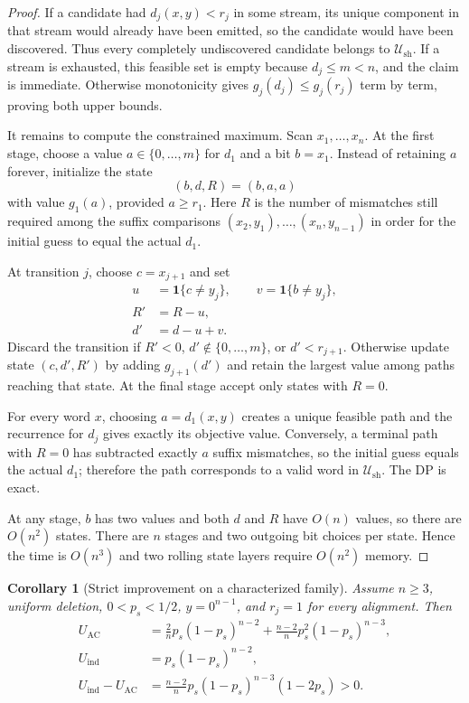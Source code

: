 \documentclass[11pt]{article}
\newtheorem{corollary}[theorem]{Corollary}
\theoremstyle{remark}
\newcommand{\ind}{\mathbf 1}
\begin{document}
\begin{proof}
If a candidate had $d_j(x,y)<r_j$ in some stream, its unique component in that stream
would already have been emitted, so the candidate would have been discovered. Thus every
completely undiscovered candidate belongs to $\mathcal U_{\mathrm{sh}}$. If a stream is
exhausted, this feasible set is empty because $d_j\le m<n$, and the claim is immediate.
Otherwise monotonicity gives $g_j(d_j)\le g_j(r_j)$ term by term, proving both upper bounds.

It remains to compute the constrained maximum. Scan $x_1,\ldots,x_n$. At the first stage,
choose a value $a\in\{0,\ldots,m\}$ for $d_1$ and a bit $b=x_1$. Instead of retaining
$a$ forever, initialize the state
\[
 (b,d,R)=(b,a,a)
\]
with value $g_1(a)$, provided $a\ge r_1$. Here $R$ is the number of mismatches still
required among the suffix comparisons $(x_2,y_1),\ldots,(x_n,y_{n-1})$ in order for the
initial guess to equal the actual $d_1$.

At transition $j$, choose $c=x_{j+1}$ and set
\begin{align*}
 u&=\ind\{c\ne y_j\},\qquad v=\ind\{b\ne y_j\},\\
 R'&=R-u,\\
 d'&=d-u+v.
\end{align*}
Discard the transition if $R'<0$, $d'\notin\{0,\ldots,m\}$, or $d'<r_{j+1}$.
Otherwise update state $(c,d',R')$ by adding $g_{j+1}(d')$ and retain the largest value
among paths reaching that state. At the final stage accept only states with $R=0$.

For every word $x$, choosing $a=d_1(x,y)$ creates a unique feasible path and the recurrence
for $d_j$ gives exactly its objective value. Conversely, a terminal path with $R=0$ has
subtracted exactly $a$ suffix mismatches, so the initial guess equals the actual $d_1$;
therefore the path corresponds to a valid word in $\mathcal U_{\mathrm{sh}}$. The DP is
exact.

At any stage, $b$ has two values and both $d$ and $R$ have $O(n)$ values, so there are
$O(n^2)$ states. There are $n$ stages and two outgoing bit choices per state. Hence the
time is $O(n^3)$ and two rolling state layers require $O(n^2)$ memory.
\end{proof}

\begin{corollary}[Strict improvement on a characterized family]
Assume $n\ge3$, uniform deletion, $0<p_s<1/2$, $y=0^{n-1}$, and $r_j=1$ for every alignment. Then
\begin{align*}
 U_{\mathrm{AC}}
 &=\frac{2}{n}p_s(1-p_s)^{n-2}
 +\frac{n-2}{n}p_s^2(1-p_s)^{n-3},\\
 U_{\mathrm{ind}}&=p_s(1-p_s)^{n-2},\\
 U_{\mathrm{ind}}-U_{\mathrm{AC}}
 &=\frac{n-2}{n}p_s(1-p_s)^{n-3}(1-2p_s)>0.
\end{align*}
\end{corollary}
\end{document}
